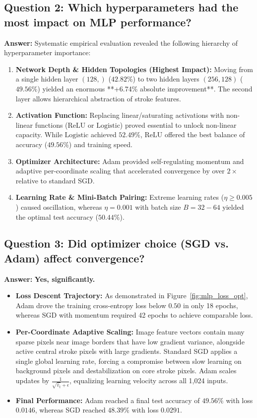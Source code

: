 \documentclass[12pt,a4paper]{article}
\begin{document}
\subsection{Question 2: Which hyperparameters had the most impact on MLP performance?}
\textbf{Answer:}
Systematic empirical evaluation revealed the following hierarchy of hyperparameter importance:
\begin{enumerate}[noitemsep]
    \item \textbf{Network Depth \& Hidden Topologies (Highest Impact):} Moving from a single hidden layer $(128,)$ ($42.82\%$) to two hidden layers $(256, 128)$ ($49.56\%$) yielded an enormous **+6.74\% absolute improvement**. The second layer allows hierarchical abstraction of stroke features.
    \item \textbf{Activation Function:} Replacing linear/saturating activations with non-linear functions ($\text{ReLU}$ or $\text{Logistic}$) proved essential to unlock non-linear capacity. While $\text{Logistic}$ achieved $52.49\%$, $\text{ReLU}$ offered the best balance of accuracy ($49.56\%$) and training speed.
    \item \textbf{Optimizer Architecture:} Adam provided self-regulating momentum and adaptive per-coordinate scaling that accelerated convergence by over $2\times$ relative to standard SGD.
    \item \textbf{Learning Rate \& Mini-Batch Pairing:} Extreme learning rates ($\eta \ge 0.005$) caused oscillation, whereas $\eta = 0.001$ with batch size $B=32-64$ yielded the optimal test accuracy ($50.44\%$).
\end{enumerate}

\subsection{Question 3: Did optimizer choice (SGD vs. Adam) affect convergence?}
\textbf{Answer:}
\textbf{Yes, significantly.}
\begin{itemize}[noitemsep]
    \item \textbf{Loss Descent Trajectory:} As demonstrated in Figure~\ref{fig:mlp_loss_opt}, Adam drove the training cross-entropy loss below $0.50$ in only 18 epochs, whereas SGD with momentum required 42 epochs to achieve comparable loss.
    \item \textbf{Per-Coordinate Adaptive Scaling:} Image feature vectors contain many sparse pixels near image borders that have low gradient variance, alongside active central stroke pixels with large gradients. Standard SGD applies a single global learning rate, forcing a compromise between slow learning on background pixels and destabilization on core stroke pixels. Adam scales updates by $\frac{1}{\sqrt{\hat{v}_t} + \epsilon}$, equalizing learning velocity across all 1,024 inputs.
    \item \textbf{Final Performance:} Adam reached a final test accuracy of $49.56\%$ with loss $0.0146$, whereas SGD reached $48.39\%$ with loss $0.0291$.
\end{itemize}
\end{document}
